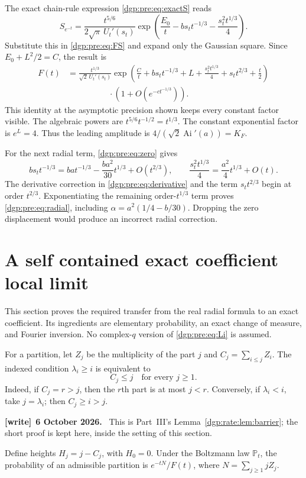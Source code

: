\documentclass[11pt,letterpaper]{article}
\numberwithin{equation}{section}
\theoremstyle{remark}\newtheorem{remark}[theorem]{Remark}
\newcommand{\PP}{\mathbb P}
\newcommand{\Ai}{\operatorname{Ai}}
\newenvironment{writenote}[1][]{\par\smallskip\begingroup\small
 \noindent\textbf{[write]}\if\relax\detokenize{#1}\relax\else~\textbf{#1.}\fi\ }%
 {\par\endgroup\smallskip}
\begin{document}
The exact chain-rule expression \eqref{dgp:pre:eq:exactS} reads
\[
 S_{e^{-t}}=\frac{t^{5/6}}{2\sqrt\pi\,U_t'(s_t)}
       \exp\left(\frac{E_0}t-bs_t t^{-1/3}
                          -\frac{s_t^2t^{1/3}}4\right).
\]
Substitute this in \eqref{dgp:pre:eq:FS} and expand only the Gaussian square.
Since $E_0+L^2/2=C$, the result is
\begin{align}
 F(t)&=\frac{t^{1/3}}{\sqrt2\,U_t'(s_t)}
    \exp\left(\frac Ct+bs_t t^{-1/3}+L
        +\frac{s_t^2t^{1/3}}4+s_t t^{2/3}+\frac t2\right)
 \nonumber\\[-2pt]
 &\hspace{5em}\cdot\left(1+O(e^{-c t^{-1/3}})\right).
 \label{dgp:pre:eq:preexpand}
\end{align}
This identity at the asymptotic precision shown keeps every constant
factor visible. The algebraic powers are $t^{5/6}t^{-1/2}=t^{1/3}$.
The constant exponential factor is $e^L=4$. Thus the leading amplitude
is $4/(\sqrt2\Ai'(a))=K_F$.

For the next radial term, \eqref{dgp:pre:eq:zero} gives
\[
 bs_t t^{-1/3}=ba t^{-1/3}-\frac{ba^2}{30}t^{1/3}+O(t^{2/3}),
 \qquad \frac{s_t^2t^{1/3}}4=\frac{a^2}4t^{1/3}+O(t).
\]
The derivative correction in \eqref{dgp:pre:eq:derivative} and the term
$s_t t^{2/3}$ begin at order $t^{2/3}$. Exponentiating the remaining
order-$t^{1/3}$ term proves \eqref{dgp:pre:eq:radial}, including
$\alpha=a^2(1/4-b/30)$. Dropping the zero displacement would produce an
incorrect radial correction.

\section{A self contained exact coefficient local limit}\label{dgp:pre:sec:local}
This section proves the required transfer from the real radial
formula to an exact coefficient. Its ingredients are elementary
probability, an exact change of measure, and Fourier inversion.
No complex-$q$ version of \eqref{dgp:pre:eq:Li} is assumed.

For a partition, let $Z_j$ be the multiplicity of the part $j$ and
$C_j=\sum_{i\leq j}Z_i$. The indexed condition $\lambda_i\geq i$ is
equivalent to
\begin{equation}
 C_j\leq j\quad\text{for every }j\geq1.
 \label{dgp:pre:eq:barrier}
\end{equation}
Indeed, if $C_j=r>j$, then the $r$th part is at most $j<r$.
Conversely, if $\lambda_i<i$, take $j=\lambda_i$; then $C_j\geq i>j$.
\begin{writenote}[6 October 2026]
This is Part~III's Lemma~\ref{dgp:rate:lem:barrier}; the short proof is kept here, inside the setting of this section.
\end{writenote}
Define heights $H_j=j-C_j$, with $H_0=0$.
Under the Boltzmann law $\PP_t$, the probability of an admissible
partition is $e^{-tN}/F(t)$, where $N=\sum_{j\geq1}jZ_j$.
\end{document}
